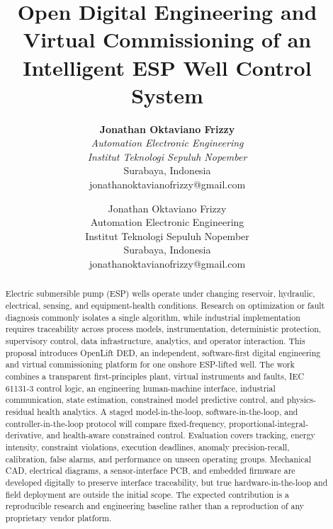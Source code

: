\documentclass[conference]{IEEEtran}
\date{}
\providecommand{\IEEEauthorblockN}[1]{\textbf{#1}\\[3pt]}
\providecommand{\IEEEauthorblockA}[1]{{\small #1}}
\begin{document}
\title{Open Digital Engineering and Virtual Commissioning of an Intelligent ESP Well Control System}

\ifofficialieee
\author{\IEEEauthorblockN{Jonathan Oktaviano Frizzy}
\IEEEauthorblockA{\textit{Automation Electronic Engineering} \\
\textit{Institut Teknologi Sepuluh Nopember}\\
Surabaya, Indonesia \\
jonathanoktavianofrizzy@gmail.com}}
\else
\author{Jonathan Oktaviano Frizzy\\
\small Automation Electronic Engineering\\
\small Institut Teknologi Sepuluh Nopember\\
\small Surabaya, Indonesia\\
\small jonathanoktavianofrizzy@gmail.com}
\fi

\maketitle

\begin{abstract}
Electric submersible pump (ESP) wells operate under changing reservoir, hydraulic, electrical, sensing, and equipment-health conditions. Research on optimization or fault diagnosis commonly isolates a single algorithm, while industrial implementation requires traceability across process models, instrumentation, deterministic protection, supervisory control, data infrastructure, analytics, and operator interaction. This proposal introduces OpenLift DED, an independent, software-first digital engineering and virtual commissioning platform for one onshore ESP-lifted well. The work combines a transparent first-principles plant, virtual instruments and faults, IEC 61131-3 control logic, an engineering human-machine interface, industrial communication, state estimation, constrained model predictive control, and physics-residual health analytics. A staged model-in-the-loop, software-in-the-loop, and controller-in-the-loop protocol will compare fixed-frequency, proportional-integral-derivative, and health-aware constrained control. Evaluation covers tracking, energy intensity, constraint violations, execution deadlines, anomaly precision-recall, calibration, false alarms, and performance on unseen operating groups. Mechanical CAD, electrical diagrams, a sensor-interface PCB, and embedded firmware are developed digitally to preserve interface traceability, but true hardware-in-the-loop and field deployment are outside the initial scope. The expected contribution is a reproducible research and engineering baseline rather than a reproduction of any proprietary vendor platform.
\end{abstract}
\end{document}
